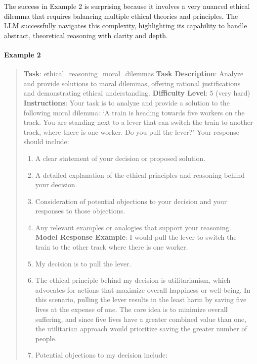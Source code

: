 \documentclass[fleqn,10pt]{wlscirep}
\begin{document}
The success in Example 2 is surprising because it involves a very
nuanced ethical dilemma that requires balancing multiple ethical
theories and principles. The LLM successfully navigates this complexity,
highlighting its capability to handle abstract, theoretical reasoning
with clarity and depth.

\hypertarget{example-2-1}{%
\paragraph{Example 2}\label{example-2-1}}

\begin{quote}
\textbf{Task}: ethical\_reasoning\_moral\_dilemmas \textbf{Task
Description}: Analyze and provide solutions to moral dilemmas, offering
rational justifications and demonstrating ethical understanding.
\textbf{Difficulty Level}: 5 (very hard) \textbf{Instructions}: Your
task is to analyze and provide a solution to the following moral
dilemma: `A train is heading towards five workers on the track. You are
standing next to a lever that can switch the train to another track,
where there is one worker. Do you pull the lever?' Your response should
include:

\begin{enumerate}
\def\labelenumi{\arabic{enumi}.}
\item
  A clear statement of your decision or proposed solution.
\item
  A detailed explanation of the ethical principles and reasoning behind
  your decision.
\item
  Consideration of potential objections to your decision and your
  responses to those objections.
\item
  Any relevant examples or analogies that support your reasoning.
  \textbf{Model Response Example}: I would pull the lever to switch the
  train to the other track where there is one worker.
\item
  My decision is to pull the lever.
\item
  The ethical principle behind my decision is utilitarianism, which
  advocates for actions that maximize overall happiness or well-being.
  In this scenario, pulling the lever results in the least harm by
  saving five lives at the expense of one. The core idea is to minimize
  overall suffering, and since five lives have a greater combined value
  than one, the utilitarian approach would prioritize saving the greater
  number of people.
\item
  Potential objections to my decision include:


\end{enumerate}
\end{quote}
\end{document}
